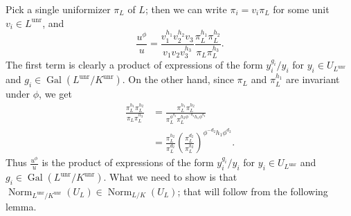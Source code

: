 \documentclass[12pt]{article}
\DeclareMathOperator{\Gal}{Gal}
\DeclareMathOperator{\Norm}{Norm}
\DeclareMathOperator{\unr}{unr}
\begin{document}
Pick a single uniformizer $\pi_L$ of $L$; then we can write $\pi_i = v_i
\pi_L$ for some unit $v_i \in L^{\unr}$, and
\[
\frac{u^\phi}{u} = \frac{v_1^{h_1} v_2^{h_2} v_3}{v_1 v_2 v_3^{h_3}}
\frac{\pi_L^{h_1} \pi_L^{h_2}}{\pi_L \pi_L^{h_3}}.
\]
The first term is clearly a product of expressions of the form
$y_i^{g_i}/y_i$ for $y_i \in U_{L^{\unr}}$ and $g_i \in
\Gal(L^{\unr}/K^{\unr})$. On the other hand, since
$\pi_L$ and $\pi_L^{h_1}$ are invariant under $\phi$, we get
\begin{align*}
\frac{\pi_L^{h_1} \pi_L^{h_2}}{\pi_L \pi_L^{h_3}}
&= \frac{\pi_L^{h_1} \pi_L^{h_2}}{\pi_L^{\phi^{d_2}}
\pi_L^{h_2 \phi^{-d_2} h_1 \phi^{d_2}}} \\
&= \frac{\pi_L^{h_2}}{\pi_L^{d_2}}
\left( \frac{\pi_L^{d_2}}{\pi_L^{h_2}} \right)^{\phi^{-d_2} h_1 \phi^{d_2}}.
\end{align*}
Thus $\frac{u^{\phi}}{u}$ is the product of expressions of the form
$y_i^{g_i}/y_i$ for $y_i \in U_{L^{\unr}}$ and $g_i \in
\Gal(L^{\unr}/K^{\unr})$. What we need to show is that
$\Norm_{L^{\unr}/K^{\unr}}(U_L) \in \Norm_{L/K}(U_L)$; that will follow
from the following lemma.
\end{document}
